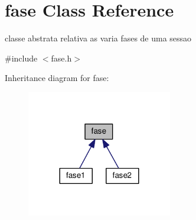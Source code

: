 \hypertarget{classfase}{}\section{fase Class Reference}
\label{classfase}


classe abstrata relativa as varia fases de uma sessao  




{\ttfamily \#include $<$fase.\+h$>$}



Inheritance diagram for fase\+:\nopagebreak
\begin{figure}[H]
\begin{center}
\leavevmode
\includegraphics[width=180pt]{classfase__inherit__graph}
\end{center}
\end{figure}
